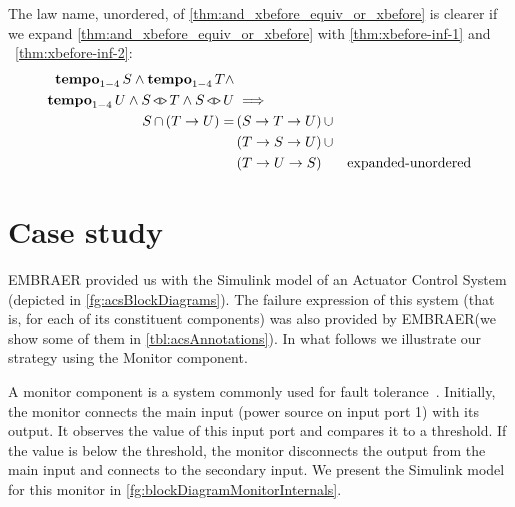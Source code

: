 \documentclass[12pt,openright,twoside,a4paper,oldfontcommands,english,brazil,draft]{abntex2}
\newcommand{\todo}[1]{\adnote{#1}}
\theoremstyle{theo}
\newcommand{\EMBRAER}{EMBRAER\xspace}
\newcommand{\simulink}{Simulink\xspace}
\def\xbeforeop{\ensuremath\rightarrow}
\newcommand{\xbefore}[2]{\ensuremath #1 \xbeforeop #2 }
\def\tempoop{\ensuremath\operatorname{\mathbf{tempo}}}
\newcommand{\tempo}[2][1-4]{\ensuremath\tempoop_{#1} #2}
\def\independenteventsop{\ensuremath\operatorname{\triangleleft\triangleright}}
\newcommand{\independentevents}[2]{\ensuremath #1 \independenteventsop #2}
\newcommand{\parsin}[1]{\ensuremath\left( #1 \right)}
\def\union{\ensuremath\operatorname{\cup}}
\def\inter{\ensuremath\operatorname{\cap}}
\begin{document}
The law name, unordered, of \eqref{thm:and_xbefore_equiv_or_xbefore} is clearer if we expand \eqref{thm:and_xbefore_equiv_or_xbefore} with \eqref{thm:xbefore-inf-1} and ~\eqref{thm:xbefore-inf-2}:
%
\begin{align}
\tempo{S} \land \tempo{T} \land \nonumber\\
  \tempo{U} \land \independentevents{S}{T} \land \independentevents{S}{U} & \implies \nonumber\\
  S \inter \parsin{\xbefore{T}{U}} = &
  \parsin{\xbefore{\xbefore{S}{T}}{U}} \union \nonumber\\
  & \parsin{\xbefore{\xbefore{T}{S}}{U}} \union \nonumber\\
  & \parsin{\xbefore{\xbefore{T}{U}}{S}} &
  \text{expanded-unordered}
  \label{thm:and_xbefore_equiv_or_xbefore_expanded}
%
%
%
\end{align}
%


\chapter{Case study}
\label{sec:case-study}

\EMBRAER provided us with the \simulink model of an Actuator Control System (depicted in \cref{fg:acsBlockDiagrams}).
The failure expression of this system (that is, for each of its constituent components) was also provided by \EMBRAER (we show some of them in \cref{tbl:acsAnnotations}).
In what follows we illustrate our strategy using the Monitor component.

A monitor component is a system commonly used for fault tolerance~\cite{ONB2002,KK2007}.
Initially, the monitor connects the main input (power source on input port 1) with its output.
It observes the value of this input port and compares it to a threshold.
If the value is below the threshold, the monitor disconnects the output from the main input and connects to the secondary input.
We present the \simulink model for this monitor in \cref{fg:blockDiagramMonitorInternals}.
\end{document}
